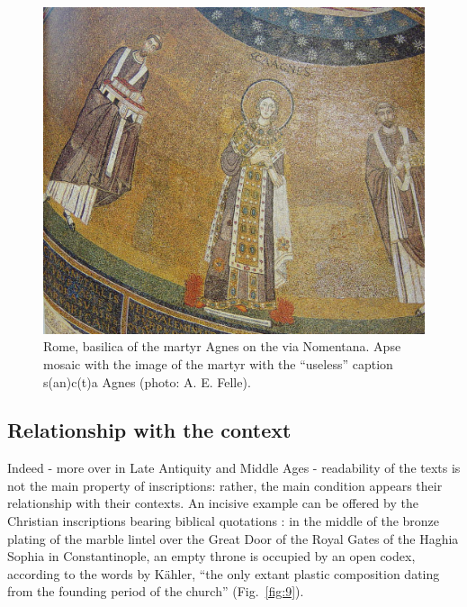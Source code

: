 \documentclass[amsthm,ebook]{saparticle}
\begin{document}
\begin{figure}[!bp]
\centering
 \includegraphics[width=\columnwidth]{FelleVisualFeaturesofinscriptionsEAGLE2016FullPaper-img011.jpg}
\caption{Rome, basilica of the martyr Agnes on the via Nomentana. Apse mosaic with the image of the martyr with the
“useless” caption  s(an)c(t)a Agnes (photo: A. E. Felle).}
\label{fig:8}
\end{figure}













\subsection{Relationship with the context}


Indeed - more over in Late Antiquity and Middle Ages - readability of the texts is not the main property of
inscriptions: rather, the main condition appears their relationship with their contexts. An incisive example can be
offered by the Christian inscriptions bearing biblical quotations \citep{felle_biblia_2006}: in the middle of the bronze
plating of the marble lintel over the Great Door of the Royal Gates of the Haghia Sophia in Constantinople, an empty
throne is occupied by an open codex, according to the words by Kähler, ``the only extant plastic
composition dating from the founding period of the church'' \citep[29-30; 32][taff. 22; 62]{kahler_hagia_1967}
(Fig.~\ref{fig:9}).
\end{document}

